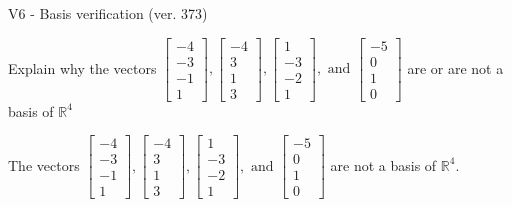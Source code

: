 \begin{exercise}
  \begin{exerciseTitle}V6 - Basis verification (ver. 373)\end{exerciseTitle}
  \begin{exerciseStatement}
    Explain why the vectors \(\left[\begin{array}{r}
-4 \\
-3 \\
-1 \\
1
\end{array}\right] , \left[\begin{array}{r}
-4 \\
3 \\
1 \\
3
\end{array}\right] , \left[\begin{array}{r}
1 \\
-3 \\
-2 \\
1
\end{array}\right] , \text{ and } \left[\begin{array}{r}
-5 \\
0 \\
1 \\
0
\end{array}\right]\) are or are not a basis of \(\mathbb{R}^4\)	


  \end{exerciseStatement}
  \begin{exerciseAnswer}
   The vectors \(\left[\begin{array}{r}
-4 \\
-3 \\
-1 \\
1
\end{array}\right] , \left[\begin{array}{r}
-4 \\
3 \\
1 \\
3
\end{array}\right] , \left[\begin{array}{r}
1 \\
-3 \\
-2 \\
1
\end{array}\right] , \text{ and } \left[\begin{array}{r}
-5 \\
0 \\
1 \\
0
\end{array}\right]\) 
  	 are not  a basis of \(\mathbb{R}^4\).
  


  \end{exerciseAnswer}
\end{exercise}
